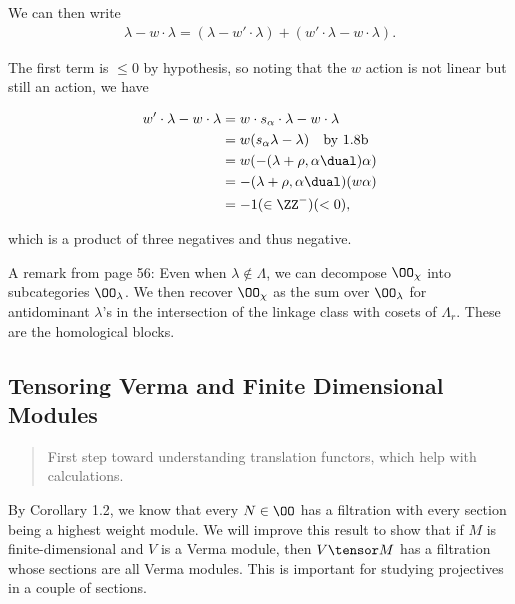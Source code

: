 \begin{description}
We can then write
\begin{align*}
\lambda - w\cdot \lambda = (\lambda - w'\cdot \lambda) + (w' \cdot \lambda - w\cdot \lambda)
.\end{align*}

The first term is \(\leq 0\) by hypothesis, so noting that the \(w\)
action is not linear but still an action, we have

\begin{align*}
w' \cdot \lambda - w\cdot \lambda 
&= w\cdot s_\alpha \cdot \lambda - w\cdot \lambda \\
&= w(s_\alpha \lambda - \lambda) \quad\text{by 1.8b} \\
&= w(-(\lambda+\rho, \alpha\dual)\alpha) \\
&= -(\lambda + \rho, \alpha\dual)(w\alpha) \\
&= -1 (\in \ZZ^-)(<0)
,\end{align*}

which is a product of three negatives and thus negative.
\end{description}

A remark from page 56: Even when \(\lambda \not \in \Lambda\), we can
decompose \(\OO_\chi\) into subcategories \(\OO_\lambda\). We then
recover \(\OO_\chi\) as the sum over \(\OO_\lambda\) for antidominant
\(\lambda\)'s in the intersection of the linkage class with cosets of
\(\Lambda_r\). These are the homological blocks.

\hypertarget{tensoring-verma-and-finite-dimensional-modules}{%
\subsection{Tensoring Verma and Finite Dimensional
Modules}\label{tensoring-verma-and-finite-dimensional-modules}}

\begin{quote}
First step toward understanding translation functors, which help with
calculations.
\end{quote}

By Corollary 1.2, we know that every \(N\in \OO\) has a filtration with
every section being a highest weight module. We will improve this result
to show that if \(M\) is finite-dimensional and \(V\) is a Verma module,
then \(V\tensor M\) has a filtration whose sections are all Verma
modules. This is important for studying projectives in a couple of
sections.

